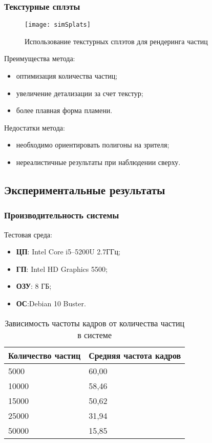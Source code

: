 \begin{frame}[t]
\frametitle{Текстурные сплэты}
\begin{wrapfigure}{r}{0.3\textwidth}
	\centering
    \texttt{[image: simSplats]}
    \caption{Использование текстурных сплэтов для рендеринга частиц}%
    \label{fig:protoSplats}
\end{wrapfigure}
Преимущества метода:
\begin{itemize}
    \item оптимизация количества частиц;
    \item увеличение детализации за счет текстур;
    \item более плавная форма пламени.
\end{itemize}

Недостатки метода:
\begin{itemize}
    \item необходимо ориентировать полигоны на зрителя;
    \item нереалистичные результаты при наблюдении сверху.
\end{itemize}
\end{frame}

\subsection{Экспериментальные результаты}
\begin{frame}
\frametitle{Производительность системы}
Тестовая среда:
\begin{itemize}
    \item \textbf{ЦП}: Intel Core i5--5200U 2.7ГГц;
    \item \textbf{ГП}: Intel HD Graphics 5500;
    \item \textbf{ОЗУ}: 8 ГБ;
    \item \textbf{ОС}:Debian 10 Buster.
\end{itemize}

\begin{table}[htb]
\caption{Зависимость частоты кадров от количества частиц в системе}%
\label{table:amountBench}
\centering
\small
\begin{tabular}{| l | l |}
    \hline
    Количество частиц & Средняя частота кадров \\
    \hline
    5000 &  60,00 \\
    \hline
    10000 & 58,46 \\
    \hline
    15000 & 50,62 \\
    \hline
    25000 & 31,94 \\
    \hline
    50000 & 15,85 \\
    \hline
\end{tabular}
\end{table}
\end{frame}

